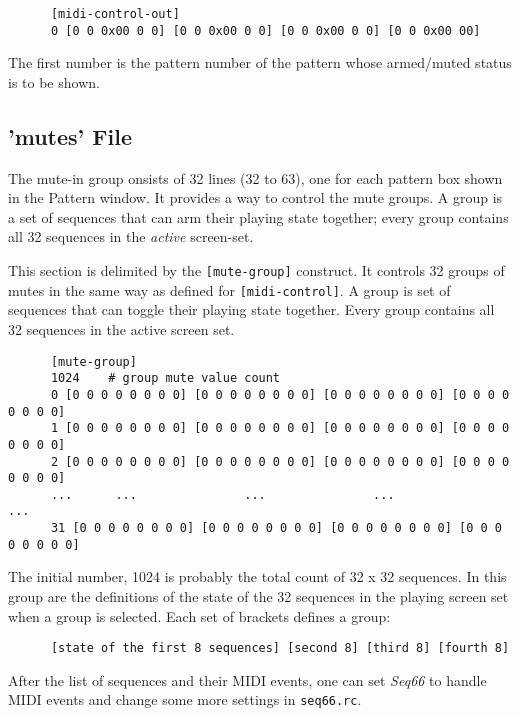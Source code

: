    \begin{verbatim}
      [midi-control-out]
      0 [0 0 0x00 0 0] [0 0 0x00 0 0] [0 0 0x00 0 0] [0 0 0x00 00]
   \end{verbatim}

   The first number is the pattern number of the pattern whose armed/muted
   status is to be shown.

\subsection{'mutes' File}
\label{subsubsec:configuration_ctrl_mute_group_control}

   The mute-in group onsists of 32 lines (32 to 63), one for each
   pattern box shown in the Pattern window.
   It provides a way to control the mute groups.
   A group is a set of sequences that can arm their playing state
   together; every group contains all 32 sequences in the
   \textsl{active} screen-set.

   This section is delimited by the \texttt{[mute-group]} construct.
   It controls 32 groups of mutes in the same way as defined for
   \texttt{[midi-control]}. A group is set of sequences that can toggle their
   playing state together.  Every group contains all 32 sequences in the
   active screen set.

   \begin{verbatim}
      [mute-group]
      1024    # group mute value count
      0 [0 0 0 0 0 0 0 0] [0 0 0 0 0 0 0 0] [0 0 0 0 0 0 0 0] [0 0 0 0 0 0 0 0]
      1 [0 0 0 0 0 0 0 0] [0 0 0 0 0 0 0 0] [0 0 0 0 0 0 0 0] [0 0 0 0 0 0 0 0]
      2 [0 0 0 0 0 0 0 0] [0 0 0 0 0 0 0 0] [0 0 0 0 0 0 0 0] [0 0 0 0 0 0 0 0]
      ...      ...               ...               ...               ...
      31 [0 0 0 0 0 0 0 0] [0 0 0 0 0 0 0 0] [0 0 0 0 0 0 0 0] [0 0 0 0 0 0 0 0]
   \end{verbatim}

   The initial number, 1024 is probably the total count of 32 x 32 sequences.
   In this group are the definitions of the state of the 32 sequences
   in the playing screen set when a group is selected.
   Each set of brackets defines a group:
   
   \begin{verbatim}
      [state of the first 8 sequences] [second 8] [third 8] [fourth 8]
   \end{verbatim}

   After the list of sequences and their MIDI events, one can 
   set \textsl{Seq66} to handle MIDI events and change some more settings
   in \texttt{seq66.rc}.

